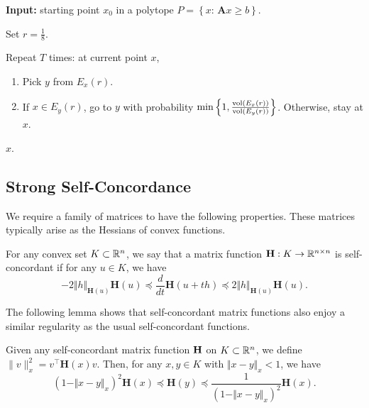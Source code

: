 \begin{algorithm2e}[H]\label{algo:Dikin}

\caption{$\mathtt{DikinWalk}$}

\SetAlgoLined

\textbf{Input:} starting point $x_{0}$ in a polytope $P=\left\{ x:\,\mathbf{A}x\ge b\right\} $.

Set $r=\frac{1}{8}$.

Repeat $T$ times: at current point $x$,
\begin{enumerate}
\item Pick $y$ from $E_{x}(r)$.
\item If $x\in E_{y}(r)$, go to $y$ with probability $\min\left\{ 1,\frac{\mathrm{vol}(E_{x}(r))}{\mathrm{vol}(E_{y}(r))}\right\} $.
Otherwise, stay at $x$.
\end{enumerate}
\Return $x$.

\end{algorithm2e}

\subsection{Strong Self-Concordance}

We require a family of matrices to have the following properties.
These matrices typically arise as the Hessians of convex functions.
\begin{defn}
For any convex set $K\subset\mathbb{R}^{n}$, we say that a matrix function
$\mathbf{H}:K\rightarrow\mathbb{R}^{n\times n}$ is self-concordant if for
any $u\in K$, we have
\[
-2\Vert h\Vert_{\mathbf{H}(u)}\mathbf{H}(u)\preceq\frac{d}{dt}\mathbf{H}(u+th)\preceq2\Vert h\Vert_{\mathbf{H}(u)}\mathbf{H}(u).
\]
\end{defn}

The following lemma shows that self-concordant matrix functions also
enjoy a similar regularity as the usual self-concordant functions.
\begin{lem}
\label{lem:global_self_concordant}Given any self-concordant matrix
function $\mathbf{H}$ on $K\subset\mathbb{R}^{n}$, we define $\|v\|^{2}_{x}=v^{\top}\mathbf{H}(x)v$.
Then, for any $x,y\in K$ with $\Vert x-y\Vert_{x}<1$, we have 
\[
\left(1-\Vert x-y\Vert_{x}\right)^{2}\mathbf{H}(x)\preceq\mathbf{H}(y)\preceq\frac{1}{\left(1-\Vert x-y\Vert_{x}\right)^{2}}\mathbf{H}(x).
\]
\end{lem}

